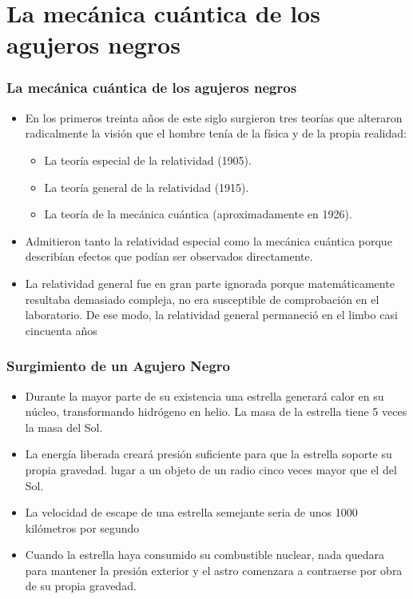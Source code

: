 \documentclass{beamer}
\begin{document}
\section[Mecánica Cuántica]{La mecánica cuántica de los agujeros negros}
\begin{frame}
 \frametitle{La mecánica cuántica de los agujeros negros}
 \begin{itemize}
  \item En los primeros treinta años de este siglo surgieron tres teorías que alteraron radicalmente la visión que el hombre tenía de la física y de la propia realidad:
    \begin{itemize}
     \item La teoría especial de la relatividad (1905).
     \item La teoría general de la relatividad (1915).
     \item La teoría de la mecánica cuántica (aproximadamente en 1926).
    \end{itemize}
  \item Admitieron tanto la relatividad especial como la mecánica cuántica porque describían efectos que podían ser observados directamente.
  \item  La relatividad general fue en gran parte ignorada porque matemáticamente resultaba demasiado compleja, no era susceptible de comprobación en el laboratorio. De ese modo, la relatividad general permaneció en el limbo casi cincuenta años 
 \end{itemize}
\end{frame}
\begin{frame}
 \frametitle{Surgimiento de un Agujero Negro}
 \begin{itemize}
  \item Durante la mayor parte de su existencia una estrella generará calor en su núcleo, transformando hidrógeno en helio. La masa de la estrella tiene 5 veces la masa del Sol.
  \item La energía liberada creará presión suficiente para que la estrella soporte su propia gravedad. lugar a un objeto de un radio cinco veces mayor que el del Sol.
  \item La velocidad de escape de una estrella semejante seria de unos 1000 kilómetros por segundo
  \item Cuando la estrella haya consumido su combustible nuclear, nada quedara para mantener la presión exterior y el astro comenzara a contraerse por obra de su propia gravedad.
 \end{itemize}
\end{frame}
\end{document}
